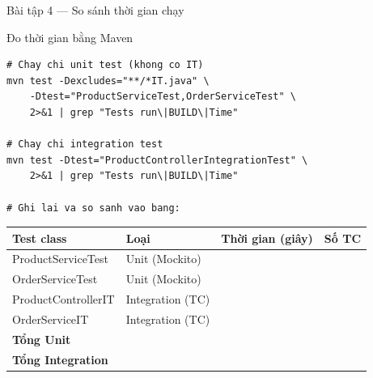 \documentclass[aspectratio=169,10pt]{beamer}
\begin{document}
\begin{frame}[fragile]{Bài tập 4 --- So sánh thời gian chạy}
  \begin{block}{Đo thời gian bằng Maven}
\begin{lstlisting}[style=bash]
# Chay chi unit test (khong co IT)
mvn test -Dexcludes="**/*IT.java" \
    -Dtest="ProductServiceTest,OrderServiceTest" \
    2>&1 | grep "Tests run\|BUILD\|Time"

# Chay chi integration test
mvn test -Dtest="ProductControllerIntegrationTest" \
    2>&1 | grep "Tests run\|BUILD\|Time"

# Ghi lai va so sanh vao bang:
\end{lstlisting}
  \end{block}

  \begin{center}
  \small
  \begin{tabular}{lp{3cm}p{2.5cm}l}
    \toprule
    \textbf{Test class} & \textbf{Loại} & \textbf{Thời gian (giây)} & \textbf{Số TC} \\
    \midrule
    ProductServiceTest & Unit (Mockito) & & \\
    OrderServiceTest   & Unit (Mockito) & & \\
    ProductControllerIT & Integration (TC) & & \\
    OrderServiceIT      & Integration (TC) & & \\
    \textbf{Tổng Unit}  & & & \\
    \textbf{Tổng Integration} & & & \\
    \bottomrule
  \end{tabular}
  \end{center}
\end{frame}
\end{document}
